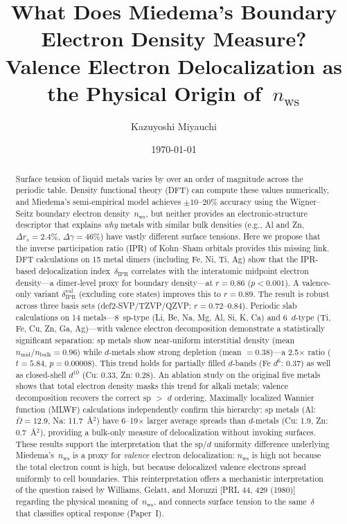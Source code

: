 \documentclass[twocolumn,showpacs,preprintnumbers,amsmath,amssymb,prb]{revtex4-2}
\begin{document}

\title{What Does Miedema's Boundary Electron Density Measure? \\
Valence Electron Delocalization as the Physical Origin of~$n_\mathrm{ws}$}

\author{Kazuyoshi Miyauchi}

\date{\today}

\begin{abstract}
Surface tension of liquid metals varies by over an order of magnitude
across the periodic table.
Density functional theory (DFT) can compute these values numerically,
and Miedema's semi-empirical model achieves $\pm 10$--$20\%$ accuracy
using the Wigner--Seitz boundary electron density~$n_\mathrm{ws}$,
but neither provides an electronic-structure descriptor
that explains \emph{why} metals with similar bulk densities
(e.g., Al and Zn, $\Delta r_s = 2.4\%$, $\Delta\gamma = 46\%$)
have vastly different surface tensions.
Here we propose that the inverse participation ratio (IPR)
of Kohn--Sham orbitals provides this missing link.
DFT calculations on 15 metal dimers (including Fe, Ni, Ti, Ag)
show that the IPR-based delocalization
index~$\delta_\mathrm{IPR}$ correlates with the interatomic
midpoint electron density---a dimer-level proxy for boundary
density---at $r = 0.86$ ($p < 0.001$).
A valence-only variant $\delta_\mathrm{IPR}^\mathrm{val}$
(excluding core states) improves this to $r = 0.89$.
The result is robust across three basis sets
(def2-SVP/TZVP/QZVP: $r = 0.72$--$0.84$).
Periodic slab calculations on 14 metals---8~sp-type
(Li, Be, Na, Mg, Al, Si, K, Ca) and 6~$d$-type
(Ti, Fe, Cu, Zn, Ga, Ag)---with valence electron
decomposition demonstrate a statistically significant
separation: sp metals show near-uniform interstitial
density (mean $n_\mathrm{mid}/n_\mathrm{bulk} = 0.96$)
while $d$-metals show strong depletion
(mean $= 0.38$)---a 2.5$\times$ ratio
($t = 5.84$, $p = 0.00008$).
This trend holds for partially filled $d$-bands
(Fe $d^6$: 0.37) as well as closed-shell $d^{10}$
(Cu: 0.33, Zn: 0.28).
An ablation study on the original five metals shows
that total electron density masks this trend for alkali
metals; valence decomposition recovers the correct
sp $>$ $d$ ordering.
Maximally localized Wannier function (MLWF) calculations
independently confirm this hierarchy: sp metals
(Al: $\bar{\Omega} = 12.9$, Na: 11.7~\AA$^2$)
have 6--19$\times$ larger average spreads than $d$-metals
(Cu: 1.9, Zn: 0.7~\AA$^2$), providing a bulk-only measure
of delocalization without invoking surfaces.
These results support the interpretation that the sp/$d$ uniformity
difference underlying Miedema's~$n_\mathrm{ws}$
is a proxy for \emph{valence} electron delocalization:
$n_\mathrm{ws}$ is high not because the total electron count
is high, but because delocalized valence electrons spread
uniformly to cell boundaries.
This reinterpretation offers a mechanistic interpretation of the question raised by
Williams, Gelatt, and Moruzzi [PRL 44, 429 (1980)]
regarding the physical meaning of~$n_\mathrm{ws}$,
and connects surface tension to the same~$\delta$ that
classifies optical response (Paper~I).
\end{abstract}
\end{document}

